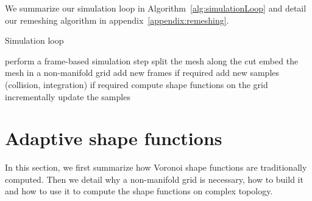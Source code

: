 We summarize our simulation loop in Algorithm~\ref{alg:simulationLoop} and detail our remeshing algorithm in appendix~\ref{appendix:remeshing}.

\begin{algorithm}[!h]
\caption[Frame-based cutting: Simulation loop]{\label{alg:simulationLoop}Simulation loop}
\begin{algorithmic}[0]
	\State perform a frame-based simulation step
	\State split the mesh along the cut
	\State embed the mesh in a non-manifold grid
	\State add new frames if required
	\State add new samples (collision, integration) if required
	\State compute shape functions on the grid
	\State incrementally update the samples
\EndFor
\end{algorithmic}
\end{algorithm}

\section{Adaptive shape functions} \label{sec:adaptivesf}

In this section, we first summarize how Voronoi shape functions are traditionally computed. 
Then we detail why a non-manifold grid is necessary, how to build it and how to use it to compute the shape functions on complex topology.

